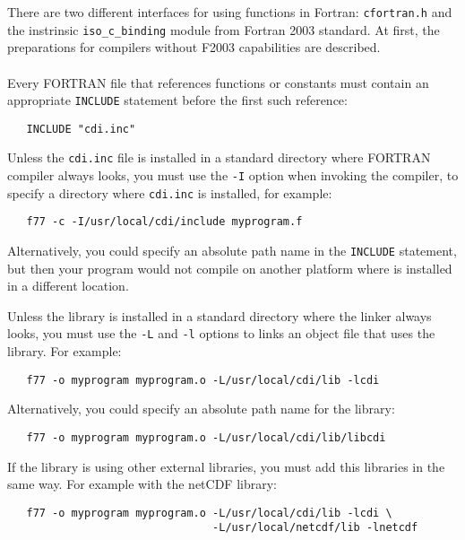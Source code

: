 There are two different interfaces for using {\CDI} functions in Fortran:
{\tt cfortran.h} and the instrinsic {\tt iso\_c\_binding} module from Fortran
2003 standard. At  first, the preparations for compilers without F2003
capabilities are described.\\\\
Every FORTRAN file that references {\CDI} functions or constants must contain
an appropriate {\tt INCLUDE} statement before the first such reference:

\begin{verbatim}
   INCLUDE "cdi.inc"
\end{verbatim}

Unless the {\tt cdi.inc} file is installed in a standard directory where
FORTRAN compiler always looks, you must use the {\tt -I} option when invoking
the compiler, to specify a directory where {\tt cdi.inc} is installed, for example:

\begin{verbatim}
   f77 -c -I/usr/local/cdi/include myprogram.f
\end{verbatim}

Alternatively, you could specify an absolute path name in the {\tt INCLUDE}
statement, but then your program would not compile on another platform
where {\CDI} is installed in a different location.

Unless the {\CDI} library is installed in a standard directory where the linker
always looks, you must use the {\tt -L} and {\tt -l} options to links an object file that
uses the {\CDI} library. For example:

\begin{verbatim}
   f77 -o myprogram myprogram.o -L/usr/local/cdi/lib -lcdi
\end{verbatim}

Alternatively, you could specify an absolute path name for the library:

\begin{verbatim}
   f77 -o myprogram myprogram.o -L/usr/local/cdi/lib/libcdi
\end{verbatim}

If the {\CDI} library is using other external libraries, you must add this
libraries in the same way.
For example with the netCDF library:

\begin{verbatim}
   f77 -o myprogram myprogram.o -L/usr/local/cdi/lib -lcdi \
                                -L/usr/local/netcdf/lib -lnetcdf
\end{verbatim}

